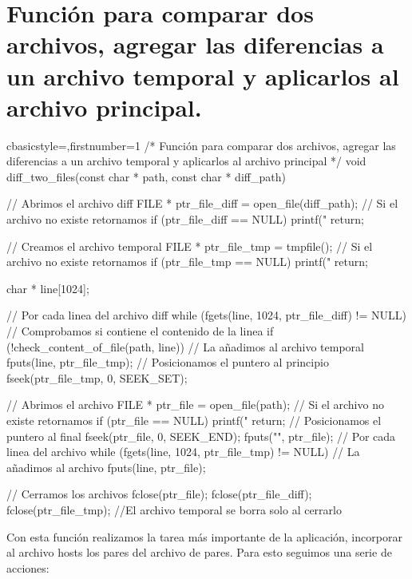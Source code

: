 \section{Función para comparar dos archivos, agregar las diferencias a un archivo temporal y aplicarlos al archivo principal.}
	\begin{sourcecodep}[]{c}{basicstyle={\fontsize{9}{9}\selectfont\ttfamily},firstnumber=1}{}
		/*
		Función para comparar dos archivos, agregar las diferencias a un archivo temporal y aplicarlos al archivo principal
		*/
		void diff_two_files(const char * path, const char * diff_path) {
			// Abrimos el archivo diff
			FILE * ptr_file_diff = open_file(diff_path);
			// Si el archivo no existe retornamos
			if (ptr_file_diff == NULL)
			{
				printf("%
				return;
			}
			
			// Creamos el archivo temporal
			FILE * ptr_file_tmp = tmpfile();
			// Si el archivo no existe retornamos
			if (ptr_file_tmp == NULL)
			{
				printf("%
				return;
			}
			
			char * line[1024];
			
			// Por cada linea del archivo diff
			while (fgets(line, 1024, ptr_file_diff) != NULL) {
				// Comprobamos si contiene el contenido de la linea
				if (!check_content_of_file(path, line)) {
					// La añadimos al archivo temporal
					fputs(line, ptr_file_tmp);
				}
			}
			// Posicionamos el puntero al principio
			fseek(ptr_file_tmp, 0, SEEK_SET);
			
			// Abrimos el archivo
			FILE * ptr_file = open_file(path);
			// Si el archivo no existe retornamos
			if (ptr_file == NULL)
			{
				printf("%
				return;
			}
			// Posicionamos el puntero al final
			fseek(ptr_file, 0, SEEK_END);
			fputs("\n", ptr_file);
			// Por cada linea del archivo 
			while (fgets(line, 1024, ptr_file_tmp) != NULL) {
				// La añadimos al archivo
				fputs(line, ptr_file);
			}
			
			// Cerramos los archivos
			fclose(ptr_file);
			fclose(ptr_file_diff);
			fclose(ptr_file_tmp); //El archivo temporal se borra solo al cerrarlo
		}\end{sourcecodep}
	Con esta función realizamos la tarea más importante de la aplicación, incorporar al archivo hosts los pares del archivo de pares. Para esto seguimos una serie de acciones:
